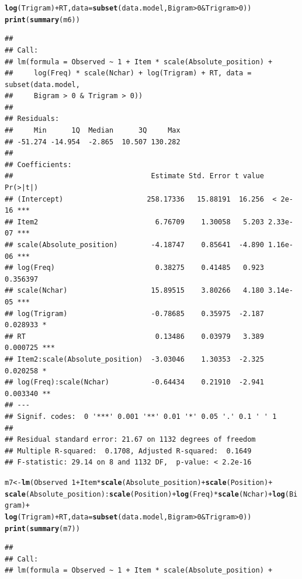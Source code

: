 \documentclass{article}\usepackage[]{graphicx}\usepackage[]{color}
\makeatletter
\newcommand{\hlnum}[1]{\textcolor[rgb]{0.686,0.059,0.569}{#1}}%
\newcommand{\hlopt}[1]{\textcolor[rgb]{0,0,0}{#1}}%
\newcommand{\hlstd}[1]{\textcolor[rgb]{0.345,0.345,0.345}{#1}}%
\newcommand{\hlkwb}[1]{\textcolor[rgb]{0.69,0.353,0.396}{#1}}%
\newcommand{\hlkwc}[1]{\textcolor[rgb]{0.333,0.667,0.333}{#1}}%
\newcommand{\hlkwd}[1]{\textcolor[rgb]{0.737,0.353,0.396}{\textbf{#1}}}%
\newenvironment{kframe}{%
 \def\at@end@of@kframe{}%
 \ifinner\ifhmode%
  \def\at@end@of@kframe{\end{minipage}}%
  \begin{minipage}{\columnwidth}%
 \fi\fi%
 \def\FrameCommand##1{\hskip\@totalleftmargin \hskip-\fboxsep
 \colorbox{shadecolor}{##1}\hskip-\fboxsep
     \hskip-\linewidth \hskip-\@totalleftmargin \hskip\columnwidth}%
 \MakeFramed {\advance\hsize-\width
   \@totalleftmargin\z@ \linewidth\hsize
   \@setminipage}}%
 {\par\unskip\endMakeFramed%
 \at@end@of@kframe}
\newenvironment{knitrout}{}{} %
\makeatother
\begin{document}
\begin{knitrout}
\begin{kframe}
\begin{alltt}
    \hlkwd{log}\hlstd{(Trigram)} \hlopt{+} \hlstd{RT,} \hlkwc{data} \hlstd{=} \hlkwd{subset}\hlstd{(data.model, Bigram} \hlopt{>} \hlnum{0} \hlopt{&} \hlstd{Trigram} \hlopt{>} \hlnum{0}\hlstd{))}
\hlkwd{print}\hlstd{(}\hlkwd{summary}\hlstd{(m6))}
\end{alltt}
\begin{verbatim}
## 
## Call:
## lm(formula = Observed ~ 1 + Item * scale(Absolute_position) + 
##     log(Freq) * scale(Nchar) + log(Trigram) + RT, data = subset(data.model, 
##     Bigram > 0 & Trigram > 0))
## 
## Residuals:
##     Min      1Q  Median      3Q     Max 
## -51.274 -14.954  -2.865  10.507 130.282 
## 
## Coefficients:
##                                 Estimate Std. Error t value Pr(>|t|)    
## (Intercept)                    258.17336   15.88191  16.256  < 2e-16 ***
## Item2                            6.76709    1.30058   5.203 2.33e-07 ***
## scale(Absolute_position)        -4.18747    0.85641  -4.890 1.16e-06 ***
## log(Freq)                        0.38275    0.41485   0.923 0.356397    
## scale(Nchar)                    15.89515    3.80266   4.180 3.14e-05 ***
## log(Trigram)                    -0.78685    0.35975  -2.187 0.028933 *  
## RT                               0.13486    0.03979   3.389 0.000725 ***
## Item2:scale(Absolute_position)  -3.03046    1.30353  -2.325 0.020258 *  
## log(Freq):scale(Nchar)          -0.64434    0.21910  -2.941 0.003340 ** 
## ---
## Signif. codes:  0 '***' 0.001 '**' 0.01 '*' 0.05 '.' 0.1 ' ' 1
## 
## Residual standard error: 21.67 on 1132 degrees of freedom
## Multiple R-squared:  0.1708,	Adjusted R-squared:  0.1649 
## F-statistic: 29.14 on 8 and 1132 DF,  p-value: < 2.2e-16
\end{verbatim}
\begin{alltt}
\hlstd{m7} \hlkwb{<-} \hlkwd{lm}\hlstd{(Observed} \hlopt{~} \hlnum{1} \hlopt{+} \hlstd{Item} \hlopt{*} \hlkwd{scale}\hlstd{(Absolute_position)} \hlopt{+} \hlkwd{scale}\hlstd{(Position)} \hlopt{+}
    \hlkwd{scale}\hlstd{(Absolute_position)}\hlopt{:}\hlkwd{scale}\hlstd{(Position)} \hlopt{+} \hlkwd{log}\hlstd{(Freq)} \hlopt{*} \hlkwd{scale}\hlstd{(Nchar)} \hlopt{+} \hlkwd{log}\hlstd{(Bigram)} \hlopt{+}
    \hlkwd{log}\hlstd{(Trigram)} \hlopt{+} \hlstd{RT,} \hlkwc{data} \hlstd{=} \hlkwd{subset}\hlstd{(data.model, Bigram} \hlopt{>} \hlnum{0} \hlopt{&} \hlstd{Trigram} \hlopt{>} \hlnum{0}\hlstd{))}
\hlkwd{print}\hlstd{(}\hlkwd{summary}\hlstd{(m7))}
\end{alltt}
\begin{verbatim}
## 
## Call:
## lm(formula = Observed ~ 1 + Item * scale(Absolute_position) + 

\end{verbatim}
\end{kframe}
\end{knitrout}
\end{document}
